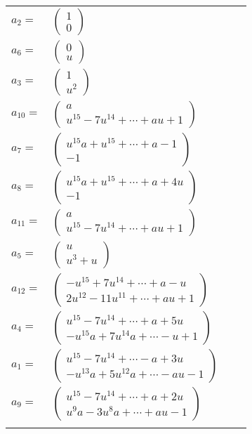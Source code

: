 \documentclass[1p]{elsarticle_modified}
\theoremstyle{definition}
\begin{document}
\begin{tabular}{m{7pt} m{180pt} m{7pt} m{180pt} }
\flushright $a_{2}=$&$\begin{pmatrix}1\\0\end{pmatrix}$ \\
\flushright $a_{6}=$&$\begin{pmatrix}0\\u\end{pmatrix}$ \\
\flushright $a_{3}=$&$\begin{pmatrix}1\\u^2\end{pmatrix}$ \\
\flushright $a_{10}=$&$\begin{pmatrix}a\\u^{15}-7 u^{14}+\cdots+a u+1\end{pmatrix}$ \\
\flushright $a_{7}=$&$\begin{pmatrix}u^{15} a+u^{15}+\cdots+a-1\\-1\end{pmatrix}$ \\
\flushright $a_{8}=$&$\begin{pmatrix}u^{15} a+u^{15}+\cdots+a+4 u\\-1\end{pmatrix}$ \\
\flushright $a_{11}=$&$\begin{pmatrix}a\\u^{15}-7 u^{14}+\cdots+a u+1\end{pmatrix}$ \\
\flushright $a_{5}=$&$\begin{pmatrix}u\\u^3+u\end{pmatrix}$ \\
\flushright $a_{12}=$&$\begin{pmatrix}- u^{15}+7 u^{14}+\cdots+a- u\\2 u^{12}-11 u^{11}+\cdots+a u+1\end{pmatrix}$ \\
\flushright $a_{4}=$&$\begin{pmatrix}u^{15}-7 u^{14}+\cdots+a+5 u\\- u^{15} a+7 u^{14} a+\cdots- u+1\end{pmatrix}$ \\
\flushright $a_{1}=$&$\begin{pmatrix}u^{15}-7 u^{14}+\cdots- a+3 u\\- u^{13} a+5 u^{12} a+\cdots- a u-1\end{pmatrix}$ \\
\flushright $a_{9}=$&$\begin{pmatrix}u^{15}-7 u^{14}+\cdots+a+2 u\\u^9 a-3 u^8 a+\cdots+a u-1\end{pmatrix}$\\&\end{tabular}
\end{document}
